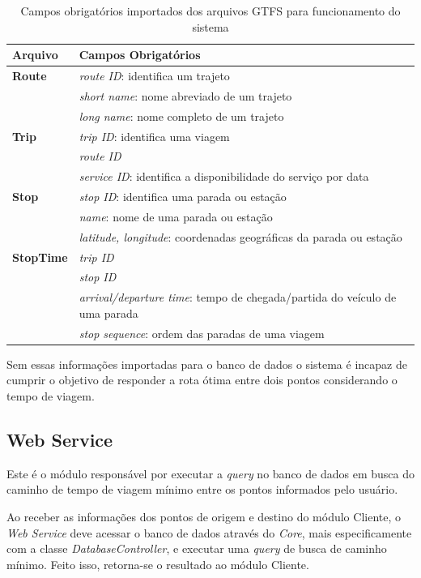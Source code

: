\begin{table}[!htb]
	\centering
	\caption{Campos obrigatórios importados dos arquivos GTFS para funcionamento do sistema}
	\label{tab:campos_obrigatorios}
	\begin{tabular}{ll}
		\hline
		\textbf{Arquivo} & \textbf{Campos Obrigatórios} \\
		\hline
		\textbf{Route} & \emph{route ID}: identifica um trajeto \\
				    & \emph{short name}: nome abreviado de um trajeto \\
				    & \emph{long name}: nome completo de um trajeto \\
		\textbf{Trip} & \emph{trip ID}: identifica uma viagem \\ 
				& \emph{route ID} \\ 
				& \emph{service ID}: identifica a disponibilidade do serviço por data \\
		\textbf{Stop} & \emph{stop ID}: identifica uma parada ou estação \\
				 & \emph{name}: nome de uma parada ou estação \\
				 & \emph{latitude, longitude}: coordenadas geográficas da parada ou estação \\
		\textbf{StopTime} & \emph{trip ID} \\
				         & \emph{stop ID} \\
				         & \emph{arrival/departure time}: tempo de chegada/partida do veículo de uma parada \\
				         & \emph{stop sequence}: ordem das paradas de uma viagem \\
		\hline
	\end{tabular}
\end{table}

Sem essas informações importadas para o banco de dados o sistema é incapaz de cumprir o objetivo de responder a rota ótima entre dois pontos considerando o tempo de viagem.

\subsection{Web Service}
Este é o módulo responsável por executar a \emph{query} no banco de dados em busca do caminho de tempo de viagem mínimo entre os pontos informados pelo usuário.

Ao receber as informações dos pontos de origem e destino do módulo Cliente, o \emph{Web Service} deve acessar o banco de dados através do \emph{Core}, mais especificamente com a classe \emph{DatabaseController}, e executar uma \emph{query} de busca de caminho mínimo. Feito isso, retorna-se o resultado ao módulo Cliente.

